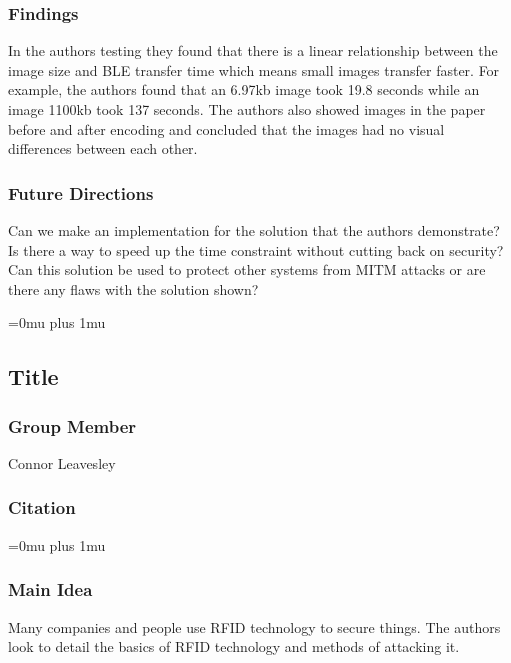 \subsubsection{Findings}

\noindent
In the authors testing they found that there is a linear relationship between the image size and BLE transfer time which means small images transfer faster. For example, the authors found that an 6.97kb image took 19.8 seconds while an image 1100kb took 137 seconds. The authors also showed images in the paper before and after encoding and concluded that the images had no visual differences between each other.

\subsubsection{Future Directions}

\noindent
Can we make an implementation for the solution that the authors demonstrate? Is there a way to speed up the time constraint without cutting back on security? Can this solution be used to protect other systems from MITM attacks or are there any flaws with the solution shown?

\Urlmuskip=0mu plus 1mu\relax


\noindent
\subsection{Title}

\subsubsection{Group Member}

\noindent
Connor Leavesley

\noindent
\subsubsection{Citation}

\Urlmuskip=0mu plus 1mu\relax

\subsubsection{Main Idea}

\noindent
Many companies and people use RFID technology to secure things. The authors look to detail the basics of RFID technology and methods of attacking it. 

